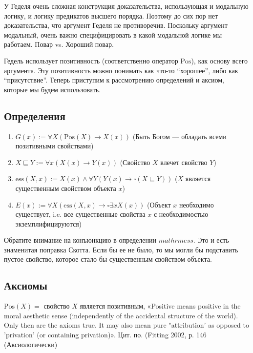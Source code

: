 \documentclass[openany]{book}
\theoremstyle{plain}
\theoremstyle{definition}
\begin{document}
У Геделя очень сложная конструкция доказательства, использующая и модальную логику, и логику предикатов высшего порядка. Поэтому до сих пор нет доказательства, что аргумент Геделя не противоречив. Поскольку аргумент модальный, очень важно специфицировать в какой модальной логике мы работаем. Повар vs. Хороший повар.

Гедель использует позитивность (соответственно оператор \(\mathrm{Pos}\)), как основу всего аргумента. Эту позитивность можно понимать как что-то ``хорошее'', либо как ``присутствие''. Теперь приступим к рассмотрению определений и аксиом, которые мы будем использовать. 

\subsection{Определения}
\begin{enumerate}
    \item \(G(x) := \forall X (\mathrm{Pos}(X) \rightarrow X(x))\) (Быть Богом --- обладать всеми позитивными свойствами)
    \item \(X \sqsubseteq Y := \forall x (X(x) \rightarrow Y(x))\) (Свойство \(X\) влечет свойство \(Y\))
    \item \(\mathrm{ess}(X, x) := X(x) \land \forall Y (Y(x) \rightarrow \square (X \sqsubseteq Y))\) (\(X\) является существенным свойством объекта \(x\))
    \item \(E(x) := \forall X (\mathrm{ess}(X, x) \rightarrow \square \exists x X(x))\) (Объект \(x\) необходимо существует, i.e. все существенные свойства \(x\) с необходимостью экземплифицируются)
\end{enumerate}

Обратите внимание на конъюнкцию в определении \(mathrm{ess}\). Это и есть знаменитая поправка Скотта. Если бы ее не было, то мы могли бы подставить пустое свойство, которое стало бы существенным  свойством объекта.

\subsection{Аксиомы}

\(\mathrm{Pos}(X) =\) свойство \(X\) является позитивным,
«Positive means positive in the moral aesthetic sense (independently of the accidental structure of the world). Only then are the axioms true. It may also mean pure "attribution' as opposed to 'privation' (or containing privation)». Цит. по. (Fitting 2002, р. 146 (Аксиологически)
\end{document}
